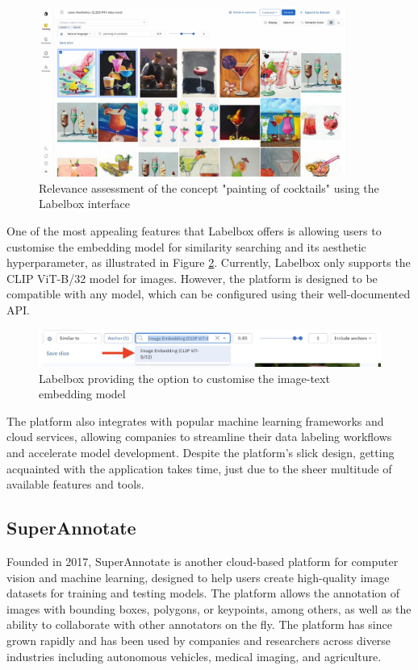 \documentclass{l4proj}
\begin{document}
\begin{figure}[h]
    \centering
    \includegraphics[width=0.9\textwidth]{figures/labelbox_interface.pdf}
    \caption{Relevance assessment of the concept "painting of cocktails" using the Labelbox interface}
    \label{fig:labelbox_interface}
\end{figure}

One of the most appealing features that Labelbox offers is allowing users to customise the embedding model for similarity searching and its aesthetic hyperparameter, as illustrated in Figure \ref{fig:labelbox_model}. Currently, Labelbox only supports the CLIP ViT-B/32 model for images. However, the platform is designed to be compatible with any model, which can be configured using their well-documented API.

\begin{figure}[h]
    \centering
    \includegraphics[width=1\textwidth]{figures/labelbox_model.pdf}
    \caption{Labelbox providing the option to customise the image-text embedding model}
    \label{fig:labelbox_model}
\end{figure}

The platform also integrates with popular machine learning frameworks and cloud services, allowing companies to streamline their data labeling workflows and accelerate model development. Despite the platform's slick design, getting acquainted with the application takes time, just due to the sheer multitude of available features and tools.


\subsection{SuperAnnotate}
\label{sec:superannotate}
Founded in 2017, SuperAnnotate is another cloud-based platform for computer vision and machine learning, designed to help users create high-quality image datasets for training and testing models. The platform allows the annotation of images with bounding boxes, polygons, or keypoints, among others, as well as the ability to collaborate with other annotators on the fly. The platform has since grown rapidly and has been used by companies and researchers across diverse industries including autonomous vehicles, medical imaging, and agriculture.
\end{document}
